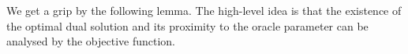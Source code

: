 We get a grip by the following lemma.
The high-level idea is that the existence of the optimal dual solution and its proximity to the oracle parameter can be analysed by the objective function.



